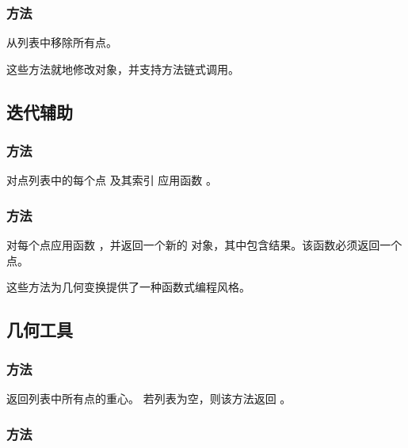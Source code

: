 \subsubsection{方法 }
\label{ssub:meth_list_point_clear}

从列表中移除所有点。


这些方法就地修改对象，并支持方法链式调用。

\subsection{迭代辅助}
\label{subsec:list_point_iteration}

\subsubsection{方法 }
\label{ssub:meth_list_point_foreach}

对点列表中的每个点  及其索引  应用函数 。

\subsubsection{方法 }
\label{ssub:meth_list_point_map}

对每个点应用函数 ，并返回一个新的  对象，其中包含结果。该函数必须返回一个点。


这些方法为几何变换提供了一种函数式编程风格。

\subsection{几何工具}
\label{subsec:list_point_geometry}

\subsubsection{方法 }
\label{ssub:meth_list_point_barycenter}

返回列表中所有点的重心。
若列表为空，则该方法返回 。

\subsubsection{方法 }
\label{ssub:meth_list_point_bbox}

